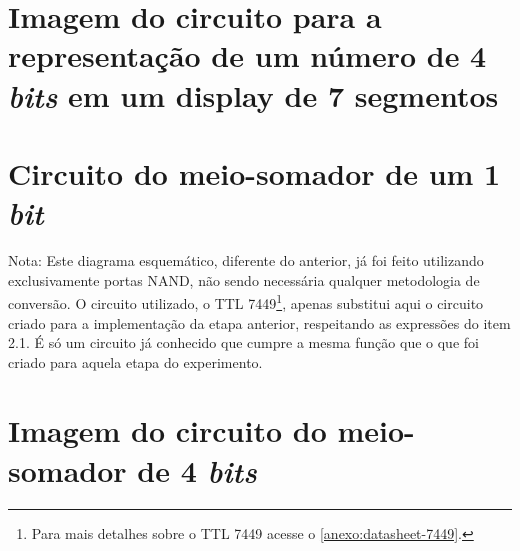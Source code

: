 
\begin{apendicesenv}

\partapendices

\chapter{Imagem do circuito para a representação de um número de 4 \textit{bits} em um display de 7 segmentos}
	\label{apendice:CircuitoEtapa1}
	

	\chapter{Circuito do meio-somador de um 1 \textit{bit}}
		\label{apendice:CircuitoEtapa2}
		

		Nota: Este diagrama esquemático, diferente do anterior, já foi feito
		utilizando exclusivamente portas NAND, não sendo necessária qualquer metodologia de conversão.
		O circuito utilizado, o TTL 7449\footnote{Para mais detalhes sobre o TTL 7449 acesse o \autoref{anexo:datasheet-7449}.}, apenas substitui aqui o circuito criado para a implementação
		da etapa anterior, respeitando as expressões do item 2.1. É só um circuito já conhecido que
		cumpre a mesma função que o que foi criado para aquela etapa do experimento.

\chapter{Imagem do circuito do meio-somador de 4 \textit{bits}}
	\label{apendice:CircuitoEtapa3}
	



\end{apendicesenv}
